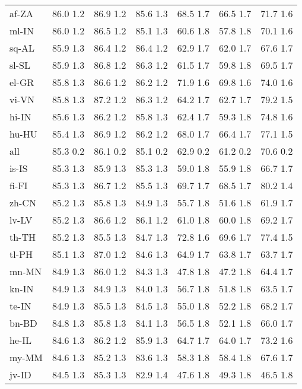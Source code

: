 \documentclass[11pt]{article}
\begin{document}
\begin{table*}[]
{\begin{tabular}{lcccccc}
af-ZA & 86.0  1.2 & 86.9  1.2 & 85.6  1.3 & 68.5  1.7 & 66.5  1.7 & 71.7  1.6 \\
ml-IN & 86.0  1.2 & 86.5  1.2 & 85.1  1.3 & 60.6  1.8 & 57.8  1.8 & 70.1  1.6 \\
sq-AL & 85.9  1.3 & 86.4  1.2 & 86.4  1.2 & 62.9  1.7 & 62.0  1.7 & 67.6  1.7 \\
sl-SL & 85.9  1.3 & 86.8  1.2 & 86.3  1.2 & 61.5  1.7 & 59.8  1.8 & 69.5  1.7 \\
el-GR & 85.8  1.3 & 86.6  1.2 & 86.2  1.2 & 71.9  1.6 & 69.8  1.6 & 74.0  1.6 \\
vi-VN & 85.8  1.3 & 87.2  1.2 & 86.3  1.2 & 64.2  1.7 & 62.7  1.7 & 79.2  1.5 \\
hi-IN & 85.6  1.3 & 86.2  1.2 & 85.8  1.3 & 62.4  1.7 & 59.3  1.8 & 74.8  1.6 \\
hu-HU & 85.4  1.3 & 86.9  1.2 & 86.2  1.2 & 68.0  1.7 & 66.4  1.7 & 77.1  1.5 \\
all & 85.3  0.2 & 86.1  0.2 & 85.1  0.2 & 62.9  0.2 & 61.2  0.2 & 70.6  0.2 \\
is-IS & 85.3  1.3 & 85.9  1.3 & 85.3  1.3 & 59.0  1.8 & 55.9  1.8 & 66.7  1.7 \\
fi-FI & 85.3  1.3 & 86.7  1.2 & 85.5  1.3 & 69.7  1.7 & 68.5  1.7 & 80.2  1.4 \\
zh-CN & 85.2  1.3 & 85.8  1.3 & 84.9  1.3 & 55.7  1.8 & 51.6  1.8 & 61.9  1.7 \\
lv-LV & 85.2  1.3 & 86.6  1.2 & 86.1  1.2 & 61.0  1.8 & 60.0  1.8 & 69.2  1.7 \\
th-TH & 85.2  1.3 & 85.5  1.3 & 84.7  1.3 & 72.8  1.6 & 69.6  1.7 & 77.4  1.5 \\
tl-PH & 85.1  1.3 & 87.0  1.2 & 84.6  1.3 & 64.9  1.7 & 63.8  1.7 & 63.7  1.7 \\
mn-MN & 84.9  1.3 & 86.0  1.2 & 84.3  1.3 & 47.8  1.8 & 47.2  1.8 & 64.4  1.7 \\
kn-IN & 84.9  1.3 & 84.9  1.3 & 84.0  1.3 & 56.7  1.8 & 51.8  1.8 & 63.5  1.7 \\
te-IN & 84.9  1.3 & 85.5  1.3 & 84.5  1.3 & 55.0  1.8 & 52.2  1.8 & 68.2  1.7 \\
bn-BD & 84.8  1.3 & 85.8  1.3 & 84.1  1.3 & 56.5  1.8 & 52.1  1.8 & 66.0  1.7 \\
he-IL & 84.6  1.3 & 86.2  1.2 & 85.9  1.3 & 64.7  1.7 & 64.0  1.7 & 73.2  1.6 \\
my-MM & 84.6  1.3 & 85.2  1.3 & 83.6  1.3 & 58.3  1.8 & 58.4  1.8 & 67.6  1.7 \\
jv-ID & 84.5  1.3 & 85.3  1.3 & 82.9  1.4 & 47.6  1.8 & 49.3  1.8 & 46.5  1.8 \\

\end{tabular}}
\end{table*}
\end{document}
